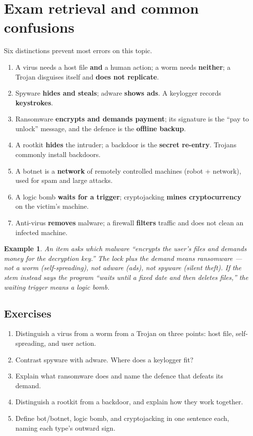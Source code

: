 \documentclass[11pt]{article}
\newtheorem{example}{Example}[section]
\begin{document}
\section{Exam retrieval and common confusions}
Six distinctions prevent most errors on this topic.
\begin{enumerate}
  \item A virus needs a host file \textbf{and} a human action; a worm needs
    \textbf{neither}; a Trojan disguises itself and \textbf{does not
    replicate}.
  \item Spyware \textbf{hides and steals}; adware \textbf{shows ads}. A
    keylogger records \textbf{keystrokes}.
  \item Ransomware \textbf{encrypts and demands payment}; its signature is
    the ``pay to unlock'' message, and the defence is the \textbf{offline
    backup}.
  \item A rootkit \textbf{hides} the intruder; a backdoor is the
    \textbf{secret re-entry}. Trojans commonly install backdoors.
  \item A botnet is a \textbf{network} of remotely controlled machines
    (robot + network), used for spam and large attacks.
  \item A logic bomb \textbf{waits for a trigger}; cryptojacking
    \textbf{mines cryptocurrency} on the victim's machine.
  \item Anti-virus \textbf{removes} malware; a firewall \textbf{filters}
    traffic and does not clean an infected machine.
\end{enumerate}

\begin{example}
An item asks which malware ``encrypts the user's files and demands money
for the decryption key.'' The lock plus the demand means ransomware ---
not a worm (self-spreading), not adware (ads), not spyware (silent theft).
If the stem instead says the program ``waits until a fixed date and then
deletes files,'' the waiting trigger means a logic bomb.
\end{example}

\subsection*{Exercises}
\begin{enumerate}[label=\arabic*.]
  \item Distinguish a virus from a worm from a Trojan on three points: host
    file, self-spreading, and user action.
  \item Contrast spyware with adware. Where does a keylogger fit?
  \item Explain what ransomware does and name the defence that defeats its
    demand.
  \item Distinguish a rootkit from a backdoor, and explain how they work
    together.
  \item Define bot/botnet, logic bomb, and cryptojacking in one sentence
    each, naming each type's outward sign.
\end{enumerate}
\end{document}
